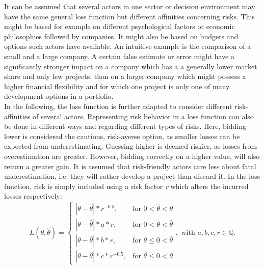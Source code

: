 		It can be assumed that several actors in one sector or decision environment may have the same general loss function but different affinities concerning risks. This might be based for example on different psychological factors or economic philosophies followed by companies. It might also be based on budgets and options such actors have available. An intuitive example is the comparison of a small and a large company. A certain false estimate or error might have a significantly stronger impact on a company which has a a generally lower market share and only few projects, than on a larger company which might possess a higher financial flexibility and for which one project is only one of many development options in a portfolio.\\		
		In the following, the loss function is further adapted to consider different risk-affinities of several actors. Representing risk behavior in a loss function can also be done in different ways and regarding different types of risks. Here, bidding lower is considered the cautious, risk-averse option, as smaller losses can be expected from underestimating. Guessing higher is deemed riskier, as losses from overestimation are greater. However, bidding correctly on a higher value, will also return a greater gain. It is assumed that risk-friendly actors care less about fatal underestimation, i.e. they will rather develop a project than discard it. In the loss function, risk is simply included using a risk factor \textit{r} which alters the incurred losses respectively:
		\begin{equation}\label{eq:LFR_final}
		L(\theta,\hat{\theta}) =
		\begin{cases}
		|\theta - \hat{\theta}|*r^{-0.5}, & \text{for } 0<\hat{\theta}<\theta  \\
		|\theta-\hat{\theta}|*a*r, & \text{for } 0<\theta<\hat{\theta} \\
		|\theta-\hat{\theta}|*b*r, & \text{for } \theta\leq0<\hat{\theta} \\
		|\theta-\hat{\theta}|*c*r^{-0.5}, & \text{for } \hat{\theta}\leq0<\theta 
		\end{cases},
		\text{ with } a,b,c,r \in \mathbb{Q}.
		\end{equation}	

